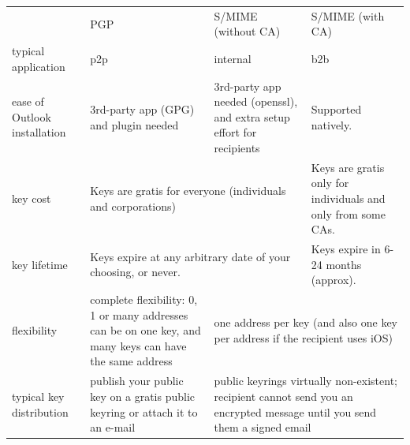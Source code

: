 \documentclass[pdftex,12pt,titlepage=false]{scrartcl}
\begin{document}
\begin{appendices}
\begin{minipage}{\textwidth}
    \begin{tabular}{p{}|p{}|p{}|p{}}
      & PGP & S/MIME \newline\small(without CA) & S/MIME \newline\small(with CA)\\
      typical application & p2p & internal & b2b\\
      ease of Outlook installation
      & 3rd-party app (GPG) and plugin needed
            & 3rd-party app needed (openssl), and extra setup effort for recipients
                                                & Supported natively.\\
      key cost
      & \multicolumn{2}{D}{Keys are gratis for everyone (individuals and corporations)}
            & Keys are gratis only for individuals and only from some CAs.\\
      key lifetime
      & \multicolumn{2}{D}{Keys expire at any arbitrary date of your choosing, or never.}
            & Keys expire in 6-24 months (approx).\\
      flexibility
      & complete flexibility: 0, 1 or many addresses can be on one key, and many keys can have the same address
            & \multicolumn{2}{S}{one address per key (and also one key per address if the recipient uses iOS)}\\
      typical key distribution
      & publish your public key on a gratis public keyring or attach it to an e-mail
            & \multicolumn{2}{S}{public keyrings virtually non-existent; recipient cannot send you an encrypted message until you send them a signed email}\\
    \end{tabular}
  \end{minipage}
\end{appendices}
\end{document}
